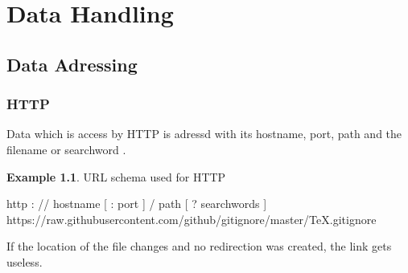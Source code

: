\documentclass[a4paper,11pt, oneside]{report}
\theoremstyle{definition}
\newtheorem{exmp}{Example}[subsection]
\begin{document}
\chapter{Data Handling}
\section{Data Adressing}
\subsection{HTTP}
Data which is access by HTTP is adressd with its hostname, port, path and the filename or searchword \cite{HTTPAdressing}.
\begin{exmp} URL schema used for HTTP
\noindent
\begin{center}
http : // hostname [ : port ] / path [ ? searchwords ]\\
https://raw.githubusercontent.com/github/gitignore/master/TeX.gitignore
\end{center}
\end{exmp}
\noindent
If the location of the file changes and no redirection was created, the link gets useless.
\noindent
\end{document}
